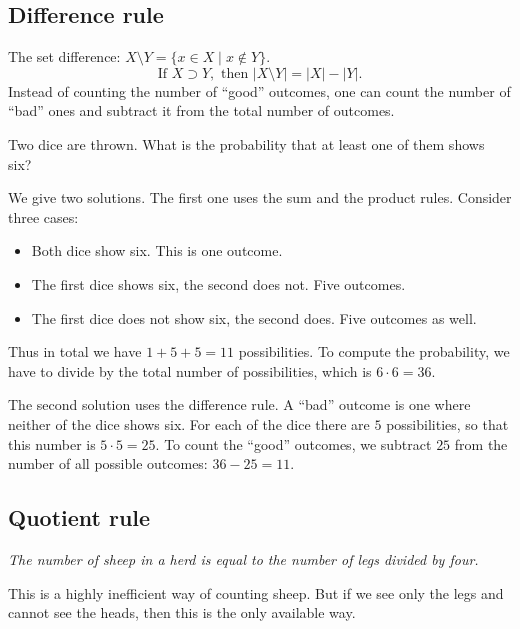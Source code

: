 \begin{page}

\subsection{Difference rule}
The set difference: $X \setminus Y = \{x \in X \mid x \notin Y\}$.
\[
\text{If }X \supset Y, \text{ then } |X \setminus Y| = |X| - |Y|.
\]
Instead of counting the number of ``good'' outcomes,
one can count the number of ``bad'' ones and subtract it from the total number of outcomes.


\end{page}

\begin{page}

\begin{exl}
Two dice are thrown. What is the probability that at least one of them shows six?

We give two solutions.
The first one uses the sum and the product rules.
Consider three cases:
\begin{itemize}
\item
Both dice show six. This is one outcome.
\item
The first dice shows six, the second does not. Five outcomes.
\item
The first dice does not show six, the second does. Five outcomes as well.
\end{itemize}
Thus in total we have $1+5+5=11$ possibilities.
To compute the probability, we have to divide by the total number of possibilities, which is $6 \cdot 6 = 36$.

The second solution uses the difference rule.
A ``bad'' outcome is one where neither of the dice shows six.
For each of the dice there are $5$ possibilities, so that this number is $5 \cdot 5 = 25$.
To count the ``good'' outcomes, we subtract $25$ from the number of all possible outcomes:
$36-25=11$.
\end{exl}

\end{page}

\begin{page}

\subsection{Quotient rule}
\begin{center}
\parbox{.9\textwidth}{\emph{The number of sheep in a herd is equal to the number of legs divided by four.}}
\end{center}
This is a highly inefficient way of counting sheep.
But if we see only the legs and cannot see the heads, then this is the only available way.


\end{page}

